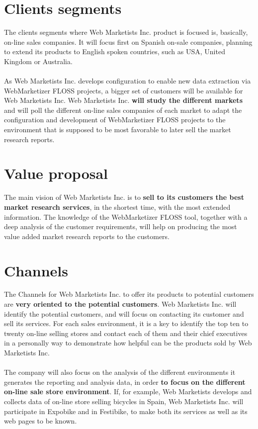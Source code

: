 \documentclass[11pt]{article}
\begin{document}
\section{Clients segments}
The clients segments where Web Marketists Inc. product is focused is, basically, on-line sales companies. It will focus first on Spanish on-sale companies, planning to extend its products to English spoken countries, such as USA, United Kingdom or Australia.\\
\\
As Web Marketists Inc. develops configuration to enable new data extraction via WebMarketizer FLOSS projects, a bigger set of customers will be available for Web Marketists Inc. Web Marketists Inc. \textbf{will study the different markets} and will poll the different on-line sales companies of each market to adapt the configuration and development of WebMarketizer FLOSS projects to the environment that is supposed to be most favorable to later sell the market research reports. 
\section{Value proposal}
The main vision of Web Marketists Inc. is to \textbf{sell to its customers the best market research services}, in the shortest time, with the most extended information. The knowledge of the WebMarketizer FLOSS tool, together with a deep analysis of the customer requirements, will help on producing the most value added market research reports to the customers.
\section{Channels}
The Channels for Web Marketists Inc. to offer its products to potential customers are \textbf{very oriented to the potential customers}. Web Marketists Inc. will identify the potential customers, and will focus on contacting its customer and sell its services. For each sales environment, it is a key to identify the top ten to twenty on-line selling stores and contact each of them and their chief executives in a personally way to demonstrate how helpful can be the products sold by Web Marketists Inc.\\
\\
The company will also focus on the analysis of the different environments it generates the reporting and analysis data, in order \textbf{to focus on the different on-line sale store environment}. If, for example, Web Marketists develops and collects data of on-line store selling bicycles in Spain, Web Marketists Inc. will participate in Expobike and in Festibike, to make both its services as well as its web pages to be known.
\end{document}

